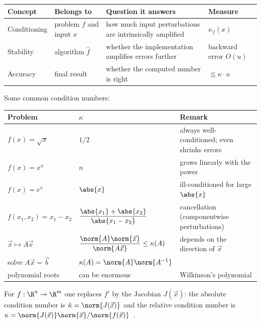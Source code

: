 \begin{center}
\begin{tabular}{l p{} p{} l}
  \toprule
  Concept & Belongs to & Question it answers & Measure \\
  \midrule
  Conditioning & problem $f$ and input $x$ & how much input perturbations are intrinsically amplified & $\kappa_f(x)$ \\
  Stability & algorithm $\hat{f}$ & whether the implementation amplifies errors further & backward error $O(u)$ \\
  Accuracy & final result & whether the computed number is right & $\lesssim \kappa \cdot u$ \\
  \bottomrule
\end{tabular}
\end{center}

Some common condition numbers:
\begin{center}
\begin{tabular}{lll}
  \toprule
  Problem & $\kappa$ & Remark \\
  \midrule
  $f(x) = \sqrt{x}$ & $1/2$ & always well-conditioned; even shrinks errors \\
  $f(x) = x^n$ & $n$ & grows linearly with the power \\
  $f(x) = e^x$ & $\abs{x}$ & ill-conditioned for large $\abs{x}$ \\
  $f(x_1, x_2) = x_1 - x_2$ & $\dfrac{\abs{x_1} + \abs{x_2}}{\abs{x_1 - x_2}}$ & cancellation (componentwise perturbations) \\
  $\vec{x} \mapsto A\vec{x}$ & $\dfrac{\norm{A}\norm{\vec{x}}}{\norm{A\vec{x}}} \le \kappa(A)$ & depends on the direction of $\vec{x}$ \\
  solve $A\vec{x} = \vec{b}$ & $\kappa(A) = \norm{A}\norm{A^{-1}}$ & \\
  polynomial roots & can be enormous & Wilkinson's polynomial \\
  \bottomrule
\end{tabular}
\end{center}
For $f : \R^n \to \R^m$ one replaces $f'$ by the Jacobian $J(\vec{x})$: the absolute condition number is $\hat{\kappa} = \norm{J(\vec{x})}$ and the relative condition number is $\kappa = \norm{J(\vec{x})}\norm{\vec{x}}/\norm{f(\vec{x})}$~\cite[Lecture 12]{TB}.

